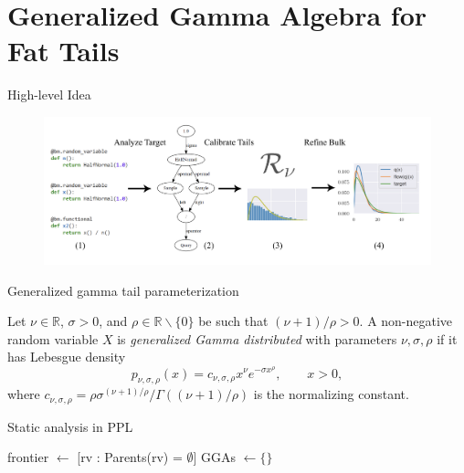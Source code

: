 \section{Generalized Gamma Algebra for Fat Tails}

\begin{frame}{High-level Idea}
    \begin{figure}
        \centering
        \includegraphics[width=1\textwidth]{Figures/gga/schematic.png}
    \end{figure}
\end{frame}

\begin{frame}{Generalized gamma tail parameterization}
    \begin{definition}
        Let $\nu \in \mathbb{R}$, $\sigma > 0$, and $\rho \in \mathbb{R} \backslash \{0\}$ be such that $(\nu+1)/ \rho > 0$.
        A non-negative random variable $X$ is \emph{generalized Gamma distributed} with parameters $\nu,\sigma,\rho$ if it has Lebesgue density
        \begin{equation}
        \label{eq:GenGammaDensity}
        p_{\nu,\sigma,\rho}(x) = c_{\nu,\sigma,\rho} x^\nu e^{-\sigma x^\rho},\qquad x > 0,
        \end{equation}
        where $c_{\nu,\sigma,\rho} = \rho \sigma^{(\nu+1)/\rho} / \Gamma((\nu+1)/\rho)$ is the normalizing constant. %
    \end{definition}
\end{frame}

\begin{subframe}{Static analysis in PPL}
    \begin{algorithm}[H]
    	\caption{Pseudocode for a GGA tails static analysis pass}\label{alg:bfs_typecheck}
    	frontier $\gets$ [rv : Parents(rv) = $\emptyset$]\;
    	GGAs $\gets \{\}$\;
    \end{algorithm}
\end{subframe}

